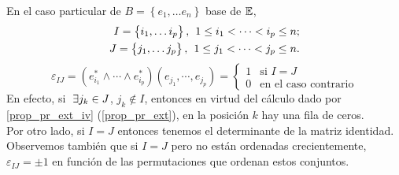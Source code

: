 \begin{obs} \label{obs_2_pr_ext}
    En el caso particular de $B=\left\{ e_1, \dots e_n \right\}$
    base de $\mathbb{E}$,
    \[
        \begin{aligned}
            I=\left\{ i_1, \dots i_p \right\}, \hspace{0.15cm}
            1 \leq i_1 < \dots < i_p \leq n ; \\
            J=\left\{ j_1, \dots j_p \right\}, \hspace{0.15cm}
            1 \leq j_1 < \dots < j_p \leq n .
        \end{aligned}
    \]
    \[
        \varepsilon _{IJ} = \left( e_{i_1}^* \wedge \cdots \wedge e_{i_p}^* \right) \left( e_{j_1}, \cdots , e_{j_p} \right)= \left\{ \begin{array}{ll}
             1 & \text{si } I=J \\
             0 & \text{en el caso contrario}
        \end{array}\right.
    \]
    En efecto, si $\hspace{0,1cm}\exists j_k \in J$, $j_k \notin I$, entonces en virtud del cálculo dado por \ref{prop_pr_ext_iv} (\ref{prop_pr_ext}), en la posición $k$ hay una fila de ceros. \\
    Por otro lado, si $I=J$ entonces tenemos el determinante de la matriz identidad. \\
    Observemos también que si $I=J$ pero no están ordenadas crecientemente, $\varepsilon _{IJ}=\pm1$ en función de las permutaciones que ordenan estos conjuntos.
\end{obs}

